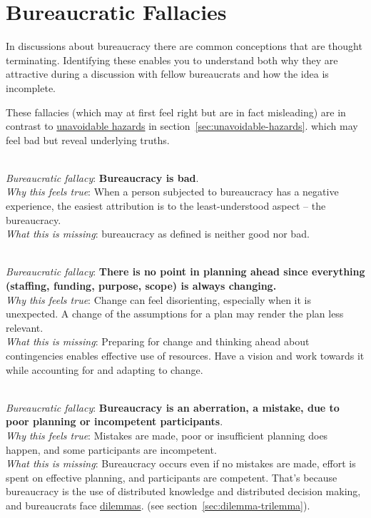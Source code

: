 \section{Bureaucratic Fallacies\label{sec:fallacies}}

In discussions about bureaucracy there are common conceptions that are \gls{thought terminating}. Identifying these enables you to understand both why they are attractive during a discussion with fellow bureaucrats and how the idea is incomplete.

These fallacies (which may at first feel right but are in fact misleading) are in contrast to  \hyperref[sec:unavoidable-hazards]{unavoidable hazards}
\ifsectionref
in section~\ref{sec:unavoidable-hazards}.
\fi
which may feel bad but reveal underlying truths.

\ \\
\textit{Bureaucratic fallacy}: \textbf{Bureaucracy is bad}. \\
\textit{Why this feels true}: When a person subjected to bureaucracy has a negative experience, the easiest attribution is to the least-understood aspect -- the bureaucracy.\\
\textit{What this is missing}: \Gls{bureaucracy} as defined is neither good nor bad. 

\ \\
\textit{Bureaucratic fallacy}: 
\textbf{There is no point in planning ahead since everything (staffing, funding, purpose, scope) is always changing.}\\
\textit{Why this feels true}: Change can feel disorienting, especially when it is unexpected. A change of the assumptions for a plan may render the plan less relevant. \\
\textit{What this is missing}: Preparing for change and thinking ahead about contingencies enables effective use of resources. Have a vision and work towards it while accounting for and adapting to change. 


\ \\
\textit{Bureaucratic fallacy}: \textbf{Bureaucracy is an aberration, a mistake, due to poor planning or incompetent participants}. \\
\textit{Why this feels true}: Mistakes are made, poor or insufficient planning does happen, and some participants are incompetent.\\
\textit{What this is missing}: Bureaucracy occurs even if no mistakes are made, effort is spent on effective planning, and participants are competent. That's because bureaucracy is the use of distributed knowledge and distributed decision making, and bureaucrats face \hyperref[sec:dilemma-trilemma]{dilemmas}.
\ifsectionref
(see section~\ref{sec:dilemma-trilemma}).
\fi

